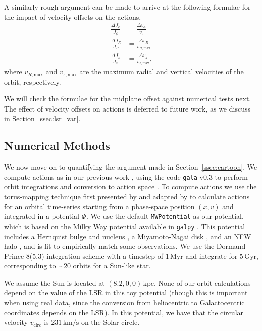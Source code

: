 \documentclass[twocolumn]{aastex62}
\newcommand{\kpc}{\text{kpc}}
\newcommand{\Myr}{\text{Myr}}
\newcommand{\Gyr}{\text{Gyr}}
\newcommand{\kms}{\text{km}/\text{s}}
\newcommand{\beq}{\begin{equation}}
\newcommand{\eeq}{\end{equation}}
\begin{document}
A similarly rough argument can be made to arrive at the following formulae for
the impact of velocity offsets on the actions,
\beq\label{eq:actions_epi_error}
\begin{split}
\frac{\Delta J_{\phi}}{J_{\phi}} &= \frac{\Delta v_{\phi}}{v_c} \\
\frac{\Delta J_R}{J_R} &= \frac{\Delta v_R}{v_{R,\text{max}}} \\
\frac{\Delta J_z}{J_z} &= \frac{\Delta v_z}{v_{z,\text{max}}}\text{,}
\end{split}
\eeq
where $v_{R,\text{max}}$ and $v_{z,\text{max}}$ are the maximum radial and
vertical velocities of the orbit, respectively.

We will check the formulae for the midplane offset against numerical tests
next. The effect of velocity offsets on actions is deferred to future work, as
we discuss in Section~\ref{ssec:lsr_var}.

\subsection{Numerical Methods} \label{ssec:action_comp}
We now move on to quantifying the argument made in Section~\ref{ssec:cartoon}.
We compute actions as in our previous work \citep{2018ApJ...867...31B}, using
the code \texttt{gala} v0.3 to perform orbit integrations and conversion to
action space \citep{2017JOSS....2..388P,Price-Whelan:2018}. To compute actions
we use the torus-mapping technique first presented by
\citet{1990MNRAS.244..634M} and adapted by \citet{2014MNRAS.441.3284S} to
calculate actions for an orbital time-series starting from a phase-space
position $(x, v)$ and integrated in a potential $\Phi$. We use the default
\texttt{MWPotential} as our potential, which is based on the Milky Way
potential available in \texttt{galpy} \citep{2015ApJS..216...29B}. This
potential includes a Hernquist bulge and nucleus \citep{1990ApJ...356..359H},
a Miyamoto-Nagai disk \citep{1975PASJ...27..533M}, and an NFW halo
\citep{1997ApJ...490..493N}, and is fit to empirically match some
observations. We use the Dormand-Prince 8(5,3) integration scheme
\citep{Dormand80:integrator} with a timestep of $1\,\Myr$ and integrate for
$5\,\Gyr$, corresponding to $\sim 20$ orbits for a Sun-like star.

We assume the Sun is located at $(8.2, 0, 0)\,\kpc$. None of our orbit
calculations depend on the value of the LSR in this toy potential (though this
is important when using real data, since the conversion from heliocentric to
Galactocentric coordinates depends on the LSR). In this potential, we have
that the circular velocity $v_{\text{circ}}$ is $231\,\kms$ on the Solar
circle.
\end{document}

